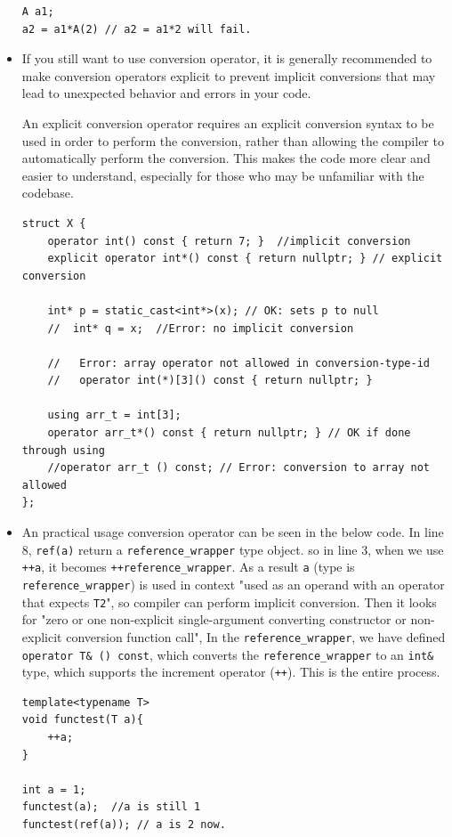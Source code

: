\documentclass[a4paper,11pt,twoside]{book}
\begin{document}
\begin{itemize}
\begin{lstlisting}[numbers=none]
A a1;
a2 = a1*A(2) // a2 = a1*2 will fail. 	
\end{lstlisting}	


		\item If you still want to use conversion operator, it is generally recommended to make conversion operators explicit to prevent implicit conversions that may lead to unexpected behavior and errors in your code.
		
		An explicit conversion operator requires an explicit conversion syntax to be used in order to perform the conversion, rather than allowing the compiler to automatically perform the conversion. This makes the code more clear and easier to understand, especially for those who may be unfamiliar with the codebase.
\begin{lstlisting}[numbers=none]	
struct X {
	operator int() const { return 7; } 	//implicit conversion
	explicit operator int*() const { return nullptr; } // explicit conversion
	
	int* p = static_cast<int*>(x); // OK: sets p to null
	//  int* q = x;  //Error: no implicit conversion
	
	//   Error: array operator not allowed in conversion-type-id
	//   operator int(*)[3]() const { return nullptr; }
	
	using arr_t = int[3];
	operator arr_t*() const { return nullptr; } // OK if done through using
	//operator arr_t () const; // Error: conversion to array not allowed
};
\end{lstlisting}	
	
	\item An practical usage conversion operator can be seen in the below code. In line 8, \texttt{ref(a)} return a \texttt{reference\_wrapper} type object. so in line 3, when we use \texttt{++a}, it becomes \texttt{++reference\_wrapper}. As a result \texttt{a} (type is \texttt{reference\_wrapper}) is used in context "used as an operand with an operator that expects \texttt{T2}", so compiler can perform implicit conversion. Then it looks for "zero or one non-explicit single-argument converting constructor or non-explicit conversion function call", In the \texttt{reference\_wrapper}, we have defined \texttt{operator T\& () const}, which converts the \texttt{reference\_wrapper} to an \texttt{int\&} type, which supports the increment operator (\texttt{++}). This is the entire process. 
\begin{lstlisting}[]
template<typename T>
void functest(T a){
	++a;
}

int a = 1;
functest(a);  //a is still 1
functest(ref(a)); // a is 2 now.	 
\end{lstlisting}		
\end{itemize}
\end{document}
